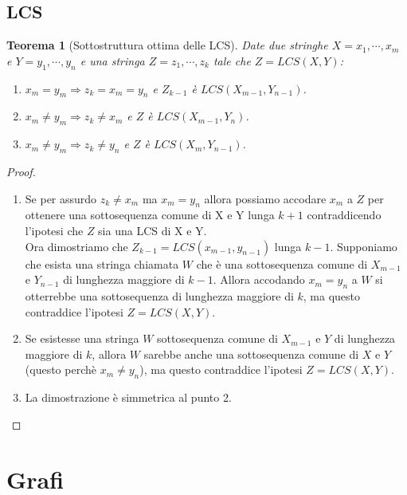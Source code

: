 \documentclass{article}
\newtheorem{theorem}{Teorema}[section]
\begin{document}
\subsection{LCS}

\begin{theorem}[Sottostruttura ottima delle LCS]
    Date due stringhe $X = x_1, \cdots, x_m$ e $Y = y_1, \cdots, y_n$ e una stringa
    $Z = z_1, \cdots, z_k$ tale che $Z = LCS(X, Y)$:
    \begin{enumerate}
        \item $x_m = y_m \Rightarrow z_k = x_m = y_n$ e $Z_{k-1}$ è $LCS(X_{m-1}, Y_{n-1})$.
        \item $x_m \neq y_m \Rightarrow z_k \neq x_m$ e $Z$ è $LCS(X_{m-1}, Y_{n})$.
        \item $x_m \neq y_m \Rightarrow z_k \neq y_n$ e $Z$ è $LCS(X_{m}, Y_{n-1})$.
    \end{enumerate}
\end{theorem}

\begin{proof}
    $ $
    \begin{enumerate}
        \item Se per assurdo $z_k \neq x_m$ ma $x_m = y_n$ allora possiamo accodare $x_m$ a $Z$ per ottenere
            una sottosequenza comune di X e Y lunga $k+1$ contraddicendo l'ipotesi che $Z$ sia una LCS di X e Y. \\
            Ora dimostriamo che $Z_{k-1} = LCS(x_{m-1}, y_{n-1})$ lunga $k - 1$. Supponiamo che esista una stringa
            chiamata $W$ che è una sottosequenza comune di $X_{m-1}$ e $Y_{n-1}$ di lunghezza maggiore di $k - 1$. Allora
            accodando $x_m = y_n$ a $W$ si otterrebbe una sottosequenza di lunghezza maggiore di $k$, ma questo contraddice
            l'ipotesi $Z = LCS(X, Y)$.
        \item Se esistesse una stringa $W$ sottosequenza comune di $X_{m-1}$ e $Y$ di lunghezza maggiore di $k$, allora
            $W$ sarebbe anche una sottosequenza comune di $X$ e $Y$ (questo perchè $x_m \neq y_n$), ma questo contraddice l'ipotesi
            $Z = LCS(X, Y)$.
        \item La dimostrazione è simmetrica al punto 2.
    \end{enumerate}
\end{proof}

\section{Grafi}
\end{document}
